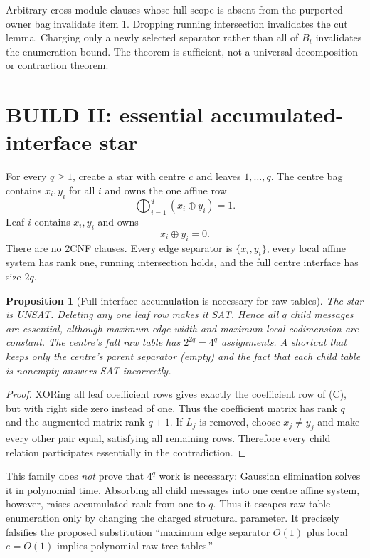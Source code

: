 \documentclass[11pt]{article}
\newtheorem{proposition}[theorem]{Proposition}
\begin{document}
Arbitrary cross-module clauses whose full scope is absent from the purported
owner bag invalidate item 1.  Dropping running intersection invalidates the
cut lemma.  Charging only a newly selected separator rather than all of $B_t$
invalidates the enumeration bound.  The theorem is sufficient, not a
universal decomposition or contraction theorem.

\section{BUILD II: essential accumulated-interface star}
For every $q\ge1$, create a star with centre $c$ and leaves $1,\ldots,q$.
The centre bag contains $x_i,y_i$ for all $i$ and owns the one affine row
\begin{equation}
 \bigoplus_{i=1}^q (x_i\oplus y_i)=1. \tag{C}
\end{equation}
Leaf $i$ contains $x_i,y_i$ and owns
\begin{equation}
 x_i\oplus y_i=0. \tag{$L_i$}
\end{equation}
There are no 2CNF clauses.  Every edge separator is
$\{x_i,y_i\}$, every local affine system has rank one, running intersection
holds, and the full centre interface has size $2q$.

\begin{proposition}[Full-interface accumulation is necessary for raw tables]
The star is UNSAT.  Deleting any one leaf row makes it SAT.  Hence all $q$
child messages are essential, although maximum edge width and maximum local
codimension are constant.  The centre's full raw table has $2^{2q}=4^q$
assignments.  A shortcut that keeps only the centre's parent separator (empty)
and the fact that each child table is nonempty answers SAT incorrectly.
\end{proposition}
\begin{proof}
XORing all leaf coefficient rows gives exactly the coefficient row of (C),
but with right side zero instead of one.  Thus the coefficient matrix has rank
$q$ and the augmented matrix rank $q+1$.  If $L_j$ is removed, choose
$x_j\ne y_j$ and make every other pair equal, satisfying all remaining rows.
Therefore every child relation participates essentially in the contradiction.
\end{proof}

This family does \emph{not} prove that $4^q$ work is necessary: Gaussian
elimination solves it in polynomial time.  Absorbing all child messages into
one centre affine system, however, raises accumulated rank from one to $q$.
Thus it escapes raw-table enumeration only by changing the charged structural
parameter.  It precisely falsifies the proposed substitution
``maximum edge separator $O(1)$ plus local $e=O(1)$ implies polynomial raw
tree tables.''
\end{document}
